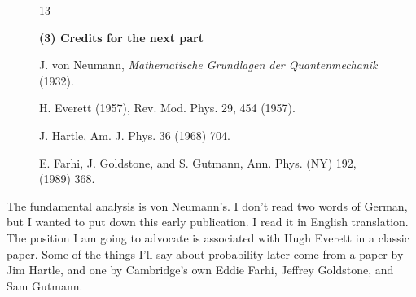 \documentclass[twocolumn,prb]{revtex4}
\begin{document}
\begin{figure}[htb] 
\begin{mdframed}
  \vspace{5pt}\hfill 13\\[-18pt]
  \begin{center}
    \textbf{(3) Credits for the next part}%
  \end{center}
  \begin{raggedright}
  \begin{enumerate}[label={[\roman*]}]\setcounter{enumi}{5}
    \item J. von Neumann, \emph{Mathematische Grundlagen der Quantenmechanik} (1932).
    \item H. Everett (1957), %
      Rev. Mod. Phys. 29, 454 (1957).
    \item J. Hartle, %
      Am. J. Phys. 36 (1968) 704.
    \item E. Farhi, J. Goldstone, and S. Gutmann, %
      Ann. Phys. (NY) 192, (1989) 368.

  \end{enumerate}
  \end{raggedright}
  \vspace{6pt}
\end{mdframed}
\end{figure}

The fundamental analysis is von Neumann's. I don't read two words of German, but I wanted to put down this early publication\cite{Neumann32}. I read it in English translation\cite{Neumann55}. The position I am going to advocate is associated with Hugh Everett in a classic paper\cite{everett57rmp454}. Some of the things I'll say about probability later come from a paper by Jim Hartle\cite{hartle68ajp704}, and one by Cambridge's own Eddie Farhi, Jeffrey Goldstone, and Sam Gutmann\cite{farhi-89ap368}.
\end{document}
